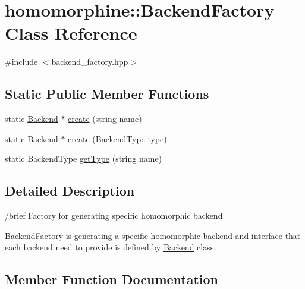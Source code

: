 \hypertarget{classhomomorphine_1_1_backend_factory}{}\section{homomorphine\+::Backend\+Factory Class Reference}
\label{classhomomorphine_1_1_backend_factory}


{\ttfamily \#include $<$backend\+\_\+factory.\+hpp$>$}

\subsection*{Static Public Member Functions}
\begin{DoxyCompactItemize}
\item 
static \mbox{\hyperlink{classhomomorphine_1_1_backend}{Backend}} $\ast$ \mbox{\hyperlink{classhomomorphine_1_1_backend_factory_a9ae5c335f385dffda0c7385e12798831}{create}} (string name)
\item 
static \mbox{\hyperlink{classhomomorphine_1_1_backend}{Backend}} $\ast$ \mbox{\hyperlink{classhomomorphine_1_1_backend_factory_a5956ea2aa0baed370946aea57bfcc45d}{create}} (Backend\+Type type)
\item 
static Backend\+Type \mbox{\hyperlink{classhomomorphine_1_1_backend_factory_a4e0ca8f0c2ce59e13955b7d4fbdf4820}{get\+Type}} (string name)
\end{DoxyCompactItemize}


\subsection{Detailed Description}
/brief Factory for generating specific homomorphic backend.

\mbox{\hyperlink{classhomomorphine_1_1_backend_factory}{Backend\+Factory}} is generating a specific homomorphic backend and interface that each backend need to provide is defined by \mbox{\hyperlink{classhomomorphine_1_1_backend}{Backend}} class. 

\subsection{Member Function Documentation}
\mbox{\label{classhomomorphine_1_1_backend_factory_a9ae5c335f385dffda0c7385e12798831}} 
